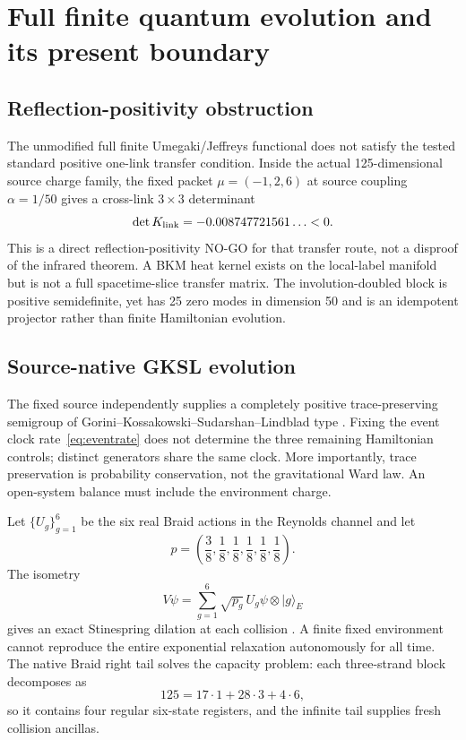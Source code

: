 \documentclass[11pt]{article}
\theoremstyle{definition}
\theoremstyle{remark}
\begin{document}
\section{Full finite quantum evolution and its present boundary}\label{sec:finitequantum}

\subsection{Reflection-positivity obstruction}

The unmodified full finite Umegaki/Jeffreys functional does not satisfy the tested standard positive one-link transfer condition. Inside the actual 125-dimensional source charge family, the fixed packet $\mu=(-1,2,6)$ at source coupling $\alpha=1/50$ gives a cross-link $3\times3$ determinant
\begin{equation}
 \det K_{\rm link}=-0.008747721561\ldots<0.
\end{equation}
This is a direct reflection-positivity NO-GO for that transfer route, not a disproof of the infrared theorem. A BKM heat kernel exists on the local-label manifold but is not a full spacetime-slice transfer matrix. The involution-doubled block is positive semidefinite, yet has 25 zero modes in dimension 50 and is an idempotent projector rather than finite Hamiltonian evolution.

\subsection{Source-native GKSL evolution}

The fixed source independently supplies a completely positive trace-preserving semigroup of Gorini--Kossakowski--Sudarshan--Lindblad type \cite{gorini1976,lindblad1976}. Fixing the event clock rate~\eqref{eq:eventrate} does not determine the three remaining Hamiltonian controls; distinct generators share the same clock. More importantly, trace preservation is probability conservation, not the gravitational Ward law. An open-system balance must include the environment charge.

Let $\{U_g\}_{g=1}^{6}$ be the six real Braid actions in the Reynolds channel and let
\begin{equation}
 p=\left(\frac38,\frac18,\frac18,\frac18,\frac18,\frac18\right).
\end{equation}
The isometry
\begin{equation}\label{eq:stinespring}
 V\psi=\sum_{g=1}^{6}\sqrt{p_g}\,U_g\psi\otimes|g\rangle_E
\end{equation}
gives an exact Stinespring dilation at each collision \cite{stinespring1955}. A finite fixed environment cannot reproduce the entire exponential relaxation autonomously for all time. The native Braid right tail solves the capacity problem: each three-strand block decomposes as
\begin{equation}
 125=17\cdot1+28\cdot3+4\cdot6,
\end{equation}
so it contains four regular six-state registers, and the infinite tail supplies fresh collision ancillas.
\end{document}
